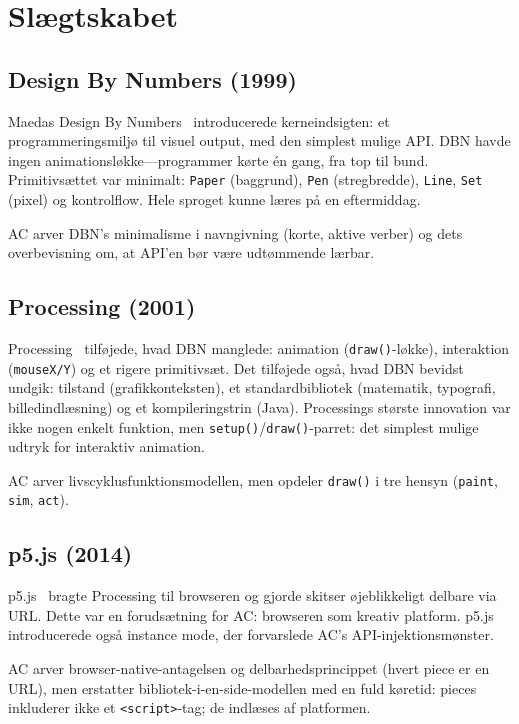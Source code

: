 \documentclass[10pt,letterpaper,twocolumn]{article}
\begin{document}
\section{Slægtskabet}
\label{sec:genealogy}

\subsection{Design By Numbers (1999)}

Maedas Design By Numbers~\citep{maeda2001dbn} introducerede kerneindsigten: et programmeringsmiljø til visuel output, med den simplest mulige API. DBN havde ingen animationsløkke---programmer kørte én gang, fra top til bund. Primitivsættet var minimalt: \texttt{Paper} (baggrund), \texttt{Pen} (stregbredde), \texttt{Line}, \texttt{Set} (pixel) og kontrolflow. Hele sproget kunne læres på en eftermiddag.

AC arver DBN's minimalisme i navngivning (korte, aktive verber) og dets overbevisning om, at API'en bør være udtømmende lærbar.

\subsection{Processing (2001)}

Processing~\citep{reas2003processing} tilføjede, hvad DBN manglede: animation (\texttt{draw()}-løkke), interaktion (\texttt{mouseX/Y}) og et rigere primitivsæt. Det tilføjede også, hvad DBN bevidst undgik: tilstand (grafikkonteksten), et standardbibliotek (matematik, typografi, billedindlæsning) og et kompileringstrin (Java). Processings største innovation var ikke nogen enkelt funktion, men \texttt{setup()}/\texttt{draw()}-parret: det simplest mulige udtryk for interaktiv animation.

AC arver livscyklusfunktionsmodellen, men opdeler \texttt{draw()} i tre hensyn (\texttt{paint}, \texttt{sim}, \texttt{act}).

\subsection{p5.js (2014)}

p5.js~\citep{mccarthy2015p5js} bragte Processing til browseren og gjorde skitser øjeblikkeligt delbare via URL. Dette var en forudsætning for AC: browseren som kreativ platform. p5.js introducerede også instance mode, der forvarslede AC's API-injektionsmønster.

AC arver browser-native-antagelsen og delbarhedsprincippet (hvert piece er en URL), men erstatter bibliotek-i-en-side-modellen med en fuld køretid: pieces inkluderer ikke et \texttt{<script>}-tag; de indlæses af platformen.
\end{document}
